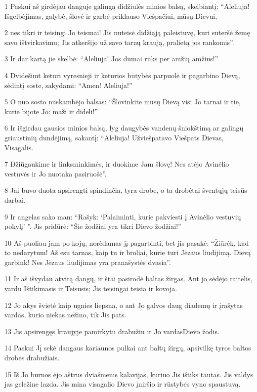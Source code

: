 \par 1 Paskui aš girdėjau danguje galingą didžiulės minios balsą, skelbiantį: “Aleliuja! Išgelbėjimas, galybė, šlovė ir garbė priklauso Viešpačiui, mūsų Dievui, 
\par 2 nes tikri ir teisingi Jo teismai! Jis nuteisė didžiąją paleistuvę, kuri suteršė žemę savo ištvirkavimu; Jis atkeršijo už savo tarnų kraują, pralietą jos rankomis”. 
\par 3 Ir dar kartą jie skelbė: “Aleliuja! Jos dūmai rūks per amžių amžius!” 
\par 4 Dvidešimt keturi vyresnieji ir keturios būtybės parpuolė ir pagarbino Dievą, sėdintį soste, sakydami: “Amen! Aleliuja!” 
\par 5 O nuo sosto nuskambėjo balsas: “Šlovinkite mūsų Dievą visi Jo tarnai ir tie, kurie bijote Jo: maži ir dideli!” 
\par 6 Ir išgirdau gausios minios balsą, lyg daugybės vandenų šniokštimą ar galingų griaustinių dundėjimą, sakantį: “Aleliuja! Užviešpatavo Viešpats Dievas, Visagalis. 
\par 7 Džiūgaukime ir linksminkimės, ir duokime Jam šlovę! Nes atėjo Avinėlio vestuvės ir Jo nuotaka pasiruošė”. 
\par 8 Jai buvo duota apsirengti spindinčia, tyra drobe, o ta drobė­tai šventųjų teisūs darbai. 
\par 9 Ir angelas sako man: “Rašyk: ‘Palaiminti, kurie pakviesti į Avinėlio vestuvių pokylį’ ”. Jis pridūrė: “Šie žodžiai yra tikri Dievo žodžiai!” 
\par 10 Aš puoliau jam po kojų, norėdamas jį pagarbinti, bet jis pasakė: “Žiūrėk, kad to nedarytum! Aš esu tarnas, kaip tu ir broliai, kurie turi Jėzaus liudijimą. Dievą garbink! Nes Jėzaus liudijimas yra pranašystės dvasia”. 
\par 11 Ir aš išvydau atvirą dangų, ir štai pasirodė baltas žirgas. Ant jo sėdėjo raitelis, vardu Ištikimasis ir Teisusis; Jis teisingai teisia ir kovoja. 
\par 12 Jo akys švietė kaip ugnies liepsna, o ant Jo galvos daug diademų ir įrašytas vardas, kurio niekas nežino, tik Jis pats. 
\par 13 Jis apsirengęs kraujyje pamirkytu drabužiu ir Jo vardas­Dievo žodis. 
\par 14 Paskui Jį sekė dangaus kariaunos pulkai ant baltų žirgų, apsivilkę tyros baltos drobės drabužiais. 
\par 15 Iš Jo burnos ėjo aštrus dviašmenis kalavijas, kuriuo Jis ištiks tautas. Jis valdys jas geležine lazda. Jis mina visagalio Dievo įniršio ir rūstybės vyno spaustuvą. 
